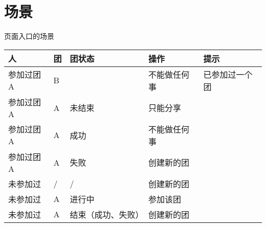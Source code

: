 \documentclass[presentation, bigger]{beamer}
\begin{document}
\section{场景}
\label{sec:orgheadline15}
\begin{frame}[label={sec:orgheadline14}]{页面入口的场景}
\begin{center}
\begin{tabular}{lllll}
人 & 团 & 团状态 & 操作 & 提示\\
\hline
参加过团A & B &  & 不能做任何事 & 已参加过一个团\\
参加过团A & A & 未结束 & 只能分享 & \\
参加过团A & A & 成功 & 不能做任何事 & \\
参加过团A & A & 失败 & 创建新的团 & \\
未参加过 & / & / & 创建新的团 & \\
未参加过 & A & 进行中 & 参加该团 & \\
未参加过 & A & 结束（成功、失败） & 创建新的团 & \\
\end{tabular}
\end{center}
\end{frame}
\end{document}
